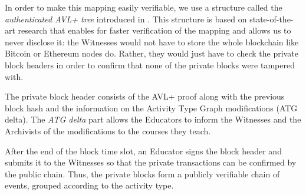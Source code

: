 In order to make this mapping easily verifiable, we use a structure called the \textit{authenticated AVL+ tree} introduced in \cite{reyzin2016improving}. This structure is based on state-of-the-art research that enables for faster verification of the mapping and allows us to never disclose it: the Witnesses would not have to store the whole blockchain like Bitcoin or Ethereum nodes do. Rather, they would just have to check the private block headers in order to confirm that none of the private blocks were tampered with.

The private block header consists of the AVL+ proof along with the previous block hash and the information on the Activity Type Graph modifications (ATG delta). The \textit{ATG delta} part allows the Educators to inform the Witnesses and the Archivists of the modifications to the courses they teach.

After the end of the block time slot, an Educator signs the block header and submits it to the Witnesses so that the private transactions can be confirmed by the public chain. Thus, the private blocks form a publicly verifiable chain of events, grouped according to the activity type.
